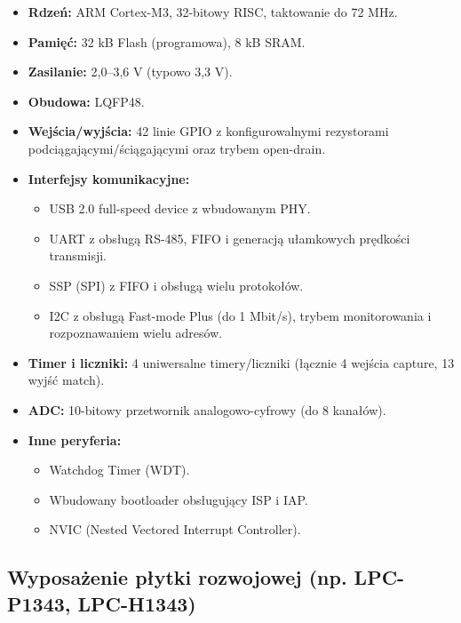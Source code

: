 \documentclass[a4paper,12pt]{report}
\begin{document}
\begin{itemize}
    \item \textbf{Rdzeń:} ARM Cortex-M3, 32-bitowy RISC, taktowanie do 72 MHz.
    \item \textbf{Pamięć:} 32 kB Flash (programowa), 8 kB SRAM.
    \item \textbf{Zasilanie:} 2,0–3,6 V (typowo 3,3 V).
    \item \textbf{Obudowa:} LQFP48.
    \item \textbf{Wejścia/wyjścia:} 42 linie GPIO z konfigurowalnymi rezystorami podciągającymi/ściągającymi oraz trybem open-drain.
    \item \textbf{Interfejsy komunikacyjne:}
    \begin{itemize}
        \item USB 2.0 full-speed device z wbudowanym PHY.
        \item UART z obsługą RS-485, FIFO i generacją ułamkowych prędkości transmisji.
        \item SSP (SPI) z FIFO i obsługą wielu protokołów.
        \item I2C z obsługą Fast-mode Plus (do 1 Mbit/s), trybem monitorowania i rozpoznawaniem wielu adresów.
    \end{itemize}
    \item \textbf{Timer i liczniki:} 4 uniwersalne timery/liczniki (łącznie 4 wejścia capture, 13 wyjść match).
    \item \textbf{ADC:} 10-bitowy przetwornik analogowo-cyfrowy (do 8 kanałów).
    \item \textbf{Inne peryferia:}
    \begin{itemize}
        \item Watchdog Timer (WDT).
        \item Wbudowany bootloader obsługujący ISP i IAP.
        \item NVIC (Nested Vectored Interrupt Controller).
    \end{itemize}
\end{itemize}

\subsection*{Wyposażenie płytki rozwojowej (np. LPC-P1343, LPC-H1343)}
\end{document}
